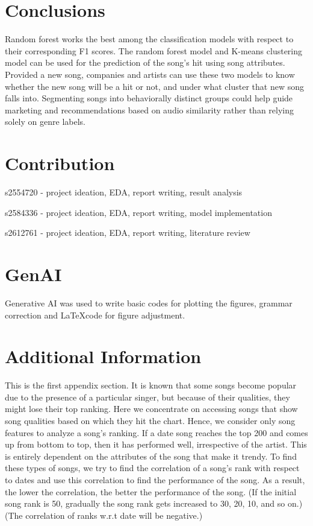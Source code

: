 \documentclass{article}
\begin{document}
\section{Conclusions}
Random forest works the best among the classification models with respect to their corresponding F1 scores. The random forest model and K-means clustering model can be used for the prediction of the song's hit using song attributes.  Provided a new song, companies and artists can use these two models to know whether the new song will be a hit or not, and under what cluster that new song falls into. Segmenting songs into behaviorally distinct groups could help guide marketing and recommendations based on audio similarity rather than relying solely on genre labels.


\pagebreak



\appendix


\section{Contribution}
s2554720 - project ideation, EDA, report writing, result analysis

s2584336 - project ideation, EDA, report writing, model implementation

s2612761 - project ideation, EDA, report writing, literature review
\section{GenAI}
Generative AI was used to write basic codes for plotting the figures, grammar correction and \LaTeX code for figure adjustment.

\section{Additional Information}
This is the first appendix section.
It is known that some songs become popular due to the presence of a particular singer, but because of their qualities, they might lose their top ranking. Here we concentrate on accessing songs that show song qualities based on which they hit the chart. Hence, we consider only song features to analyze a song's ranking. If a date song reaches the top 200 and comes up from bottom to top, then it has performed well, irrespective of the artist. This is entirely dependent on the attributes of the song that make it trendy. To find these types of songs, we try to find the correlation of a song’s rank with respect to dates and use this correlation to find the performance of the song. As a result, the lower the correlation, the better the performance of the song. (If the initial song rank is 50, gradually the song rank gets increased to 30, 20, 10, and so on.) (The correlation of ranks w.r.t date will be negative.)
\end{document}
